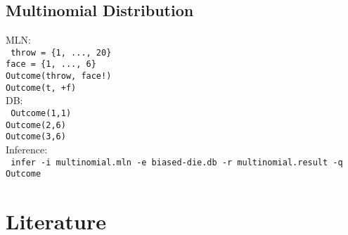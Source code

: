 \documentclass{beamer}
\begin{document}
\subsection{Multinomial Distribution}
\begin{frame}{\insertsubsection}
MLN:\\
\texttt{\small
  throw = \{1, ..., 20\}\\
  face  = \{1, ..., 6\}\\
  Outcome(throw, face!)\\
  Outcome(t, +f)}\\
\vspace{0.5cm}
DB:\\
\texttt{\small
  Outcome(1,1)\\
  Outcome(2,6)\\
  Outcome(3,6)}\\
\vspace{0.5cm}
Inference:\\
\texttt{\small
  infer -i multinomial.mln -e biased-die.db -r multinomial.result -q Outcome}
\end{frame}

\section{Literature}
\begin{frame}{\insertsection}
  
  
\end{frame}
\end{document}
